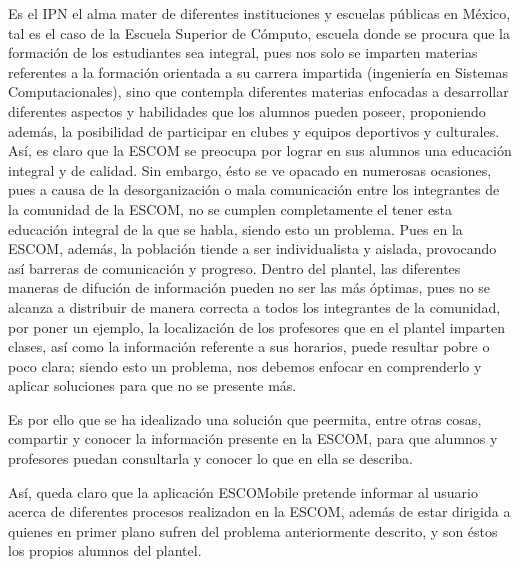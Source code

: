 \noindent
Es el IPN el alma mater de diferentes instituciones y escuelas públicas en México, tal es el caso de la Escuela Superior de Cómputo, escuela donde se procura que la formación de los estudiantes sea integral, pues nos solo se imparten materias referentes a la formación orientada a su carrera impartida (ingeniería en Sistemas Computacionales), sino que contempla diferentes materias enfocadas a desarrollar diferentes aspectos y habilidades que los alumnos pueden poseer, proponiendo además, la posibilidad de participar en clubes y equipos deportivos y culturales. Así, es claro que la ESCOM se preocupa por lograr en sus alumnos una educación integral y de calidad. Sin embargo, ésto se ve opacado en numerosas ocasiones, pues a causa de la desorganización o mala comunicación entre los integrantes de la comunidad de la ESCOM, no se cumplen completamente el tener esta educación integral de la que se habla, siendo esto un problema. Pues en la ESCOM, además, la población tiende a ser individualista y aislada, provocando así barreras de comunicación y progreso. Dentro del plantel, las diferentes maneras de difución de información pueden no ser las más óptimas, pues no se alcanza a distribuir de manera correcta a todos los integrantes de la comunidad, por poner un ejemplo, la localización de los profesores que en el plantel imparten clases, así como la información referente a sus horarios, puede resultar pobre o poco clara; siendo esto un problema, nos debemos enfocar en comprenderlo y aplicar soluciones para que no se presente más. 

\noindent 
Es por ello que se ha idealizado una solución que peermita, entre otras cosas, compartir y conocer la información presente en la ESCOM, para que alumnos y profesores puedan consultarla y conocer lo que en ella se describa. 

\noindent
Así, queda claro que la aplicación ESCOMobile pretende informar al usuario acerca de diferentes procesos realizadon en la ESCOM, además de estar dirigida a quienes en primer plano sufren del problema anteriormente descrito, y son éstos los propios alumnos del plantel.